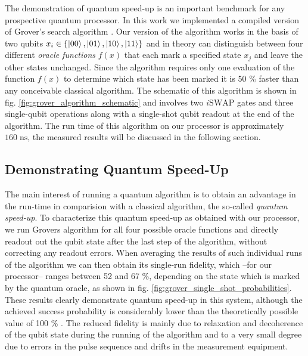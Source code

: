 The demonstration of quantum speed-up is an important benchmark for any prospective quantum processor. In this work we implemented a compiled version of Grover's search algorithm \citep{Grover_Quantum_1997}. Our version of the algorithm works in the basis of two qubits $x_i \in \{\left| 00 \right>,\left| 01 \right>,\left| 10 \right>,\left| 11 \right>\}$ and in theory can distinguish between four different {\it oracle functions} $f(x)$ that each mark a specified state $x_j$ and leave the other states unchanged. Since the algorithm requires only one evaluation of the function $f(x)$ to determine which state has been marked it is 50 \% faster than any conceivable classical algorithm. The schematic of this algorithm is shown in fig. \ref{fig:grover_algorithm_schematic} and involves two $i\mathrm{SWAP}$ gates and three single-qubit operations along with a single-shot qubit readout at the end of the algorithm. The run time of this algorithm on our processor is approximately $160\;\mathrm{ns}$, the measured results will be discussed in the following section. 

\subsection{Demonstrating Quantum Speed-Up}

The main interest of running a quantum algorithm is to obtain an advantage in the run-time in comparision with a classical algorithm, the so-called {\it quantum speed-up}. To characterize this quantum speed-up as obtained with our processor, we run Grovers algorithm for all four possible oracle functions and directly readout out the qubit state after the last step of the algorithm, without correcting any readout errors. When averaging the results of such individual runs of the algorithm we can then obtain its single-run fidelity, which --for our processor-- ranges between 52 and 67 \%, depending on the state which is  marked by the quantum oracle, as shown in fig. \ref{fig:grover_single_shot_probabilities}. These results clearly demonstrate quantum speed-up in this system, although the achieved success probability is considerably lower than the theoretically possible value of 100 \% . The reduced fidelity is mainly due to relaxation and decoherence of the qubit state during the running of the algorithm and to a very small degree due to errors in the pulse sequence and drifts in the measurement equipment.

